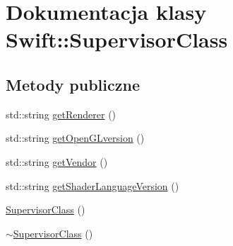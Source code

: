 \hypertarget{class_swift_1_1_supervisor_class}{\section{Dokumentacja klasy Swift\-:\-:Supervisor\-Class}
\label{class_swift_1_1_supervisor_class}
}
\subsection*{Metody publiczne}
\begin{DoxyCompactItemize}
\item 
std\-::string \hyperlink{class_swift_1_1_supervisor_class_a61de186286647e800f29daaa0ee1c4f2}{get\-Renderer} ()
\item 
std\-::string \hyperlink{class_swift_1_1_supervisor_class_ad34493aab889bc6b02de096fb5a91438}{get\-Open\-G\-Lversion} ()
\item 
std\-::string \hyperlink{class_swift_1_1_supervisor_class_afef1724b416b8fc506a6683dc427fb23}{get\-Vendor} ()
\item 
std\-::string \hyperlink{class_swift_1_1_supervisor_class_a7c04ed59b515b69cc84926fc3b697a8e}{get\-Shader\-Language\-Version} ()
\item 
\hyperlink{class_swift_1_1_supervisor_class_a7859add3cb374988faa7d290d0cec628}{Supervisor\-Class} ()
\item 
\hyperlink{class_swift_1_1_supervisor_class_ae280bf97af5a687cd29feee26288d33b}{$\sim$\-Supervisor\-Class} ()
\end{DoxyCompactItemize}


